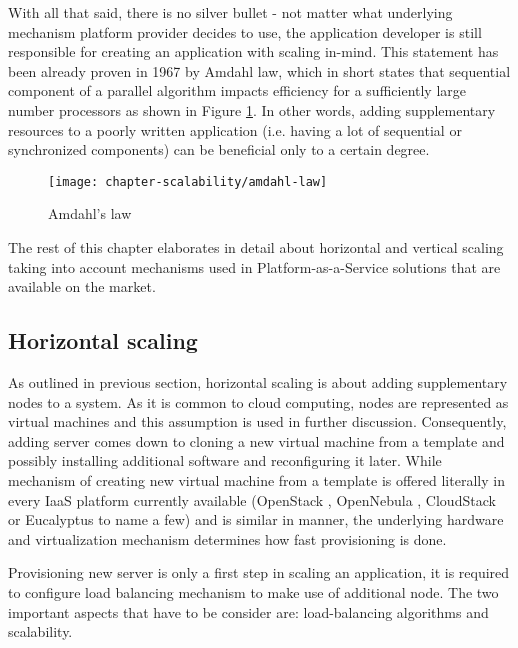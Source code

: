With all that said, there is no silver bullet - not matter what underlying mechanism platform provider decides to use, the application developer is still responsible for creating an application with scaling in-mind. This statement has been already proven in 1967 by Amdahl law, which in short states that sequential component of a parallel algorithm impacts efficiency for a sufficiently large number processors \cite{Am67} as shown in Figure \ref{fig:amdahl-law}. In other words, adding supplementary resources to a poorly written application (i.e. having a lot of sequential or synchronized components) can be beneficial only to a certain degree. 

\begin{figure}[!ht]
  \begin{center}
    \texttt{[image: chapter-scalability/amdahl-law]}
  \end{center}
  \caption{Amdahl's law}
  \label{fig:amdahl-law}
\end{figure}



The rest of this chapter elaborates in detail about horizontal and vertical scaling taking into account mechanisms used in Platform-as-a-Service solutions that are available on the market.

\subsection{Horizontal scaling}
As outlined in previous section, horizontal scaling is about adding supplementary nodes to a system. As it is common to cloud computing, nodes are represented as virtual machines and this assumption is used in further discussion. Consequently, adding server comes down to cloning a new virtual machine from a template and possibly installing additional software and reconfiguring it later. While mechanism of creating new virtual machine from a template is offered literally in every IaaS platform currently available (OpenStack \cite{OpenStack}, OpenNebula \cite{OpenNebula}, CloudStack \cite{CloudStack} or Eucalyptus \cite{Eucalyptus} to name a few) and is similar in manner, the underlying hardware and virtualization mechanism determines how fast provisioning is done. 

Provisioning new server is only a first step in scaling an application, it is required to configure load balancing mechanism to make use of additional node. The two important aspects that have to be consider are: load-balancing algorithms and scalability.

